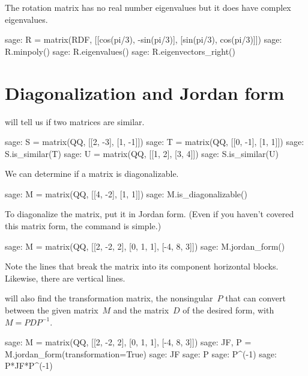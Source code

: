 The rotation matrix has no real number eigenvalues
but it does have complex eigenvalues.
\begin{sagecommandline}
sage: R = matrix(RDF, [[cos(pi/3), -sin(pi/3)], [sin(pi/3), cos(pi/3)]])
sage: R.minpoly()
sage: R.eigenvalues()
sage: R.eigenvectors_right()
\end{sagecommandline}




\section{Diagonalization and Jordan form}

\Sage{} will tell us if two matrices are similar.
\begin{sagecommandline}
sage: S =  matrix(QQ, [[2, -3], [1, -1]]) 
sage: T =  matrix(QQ, [[0, -1], [1,  1]]) 
sage: S.is_similar(T)
sage: U =  matrix(QQ, [[1, 2], [3,  4]]) 
sage: S.is_similar(U)
\end{sagecommandline}
\noindent

We can determine if a matrix is diagonalizable.
\begin{sagecommandline}
sage: M =  matrix(QQ, [[4, -2], [1, 1]])  
sage: M.is_diagonalizable()
\end{sagecommandline}
\noindent
To diagonalize the matrix, put it in Jordan form.
(Even if you haven't covered this matrix form, the command is simple.)
\begin{sagecommandline}
sage: M =  matrix(QQ, [[2, -2, 2], [0, 1, 1], [-4, 8, 3]])  
sage: M.jordan_form()
\end{sagecommandline}
Note the \inlinecode{-+-+-} lines that break the matrix into its component
horizontal blocks.
Likewise, there are vertical lines.

\Sage{} will also find the transformation matrix, the nonsingular~$P$ 
that can convert between the given matrix~$M$ and the matrix~$D$ 
of the desired form, with $M=PDP^{-1}$.
\begin{sagecommandline}[d,0,1]
sage: M =  matrix(QQ, [[2, -2, 2], [0, 1, 1], [-4, 8, 3]])  
sage: JF, P = M.jordan_form(transformation=True)
sage: JF
sage: P
sage: P^(-1)
sage: P*JF*P^(-1)
\end{sagecommandline}

